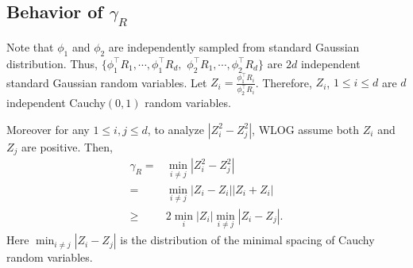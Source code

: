 \documentclass[twoside]{article}
\newcommand{\Ephione}{\mathcal{E}_{\phi_1}}
\theoremstyle{definition}
\begin{document}
\subsection{Behavior of $\gamma_R$}
\label{subsec:gammaR}
Note that $\phi_1$ and $\phi_2$ are independently sampled from standard Gaussian distribution. 
Thus, $\{\phi_1^{\top}R_1, \cdots, \phi_1^{\top}R_d,$ $\phi_2^{\top}R_1, \cdots, \phi_2^{\top}R_d\}$ are $2d$ independent standard Gaussian random variables. 
Let $Z_i = \frac{\phi_1^{\top}R_i}{\phi_2^{\top}R_i}$. Therefore, $Z_i$, $1\le i\le d$ are $d$ independent Cauchy$(0,1)$ random variables. 

Moreover for any $1\le i, j \le d$, to analyze $\left\vert Z_i^2 - Z_j^2\right\vert
$, WLOG assume both $Z_i$ and $Z_j$ are positive. Then, 
\begin{align*}
\gamma_R =	& \min_{i\neq j} \left\vert Z_i^2 - Z_j^2 \right\vert \\
	=		& \min_{i\neq j}\left\vert Z_i - Z_i \right\vert	\left\vert Z_i + Z_i \right\vert \\
	\ge 	& 2\min_i\vert Z_i\vert\min_{i\neq j} \left\vert Z_i - Z_j \right\vert.
\end{align*}
Here $\min_{i\neq j} \left\vert Z_i - Z_j \right\vert$ is the distribution of the minimal spacing of Cauchy random variables.
\end{document}
